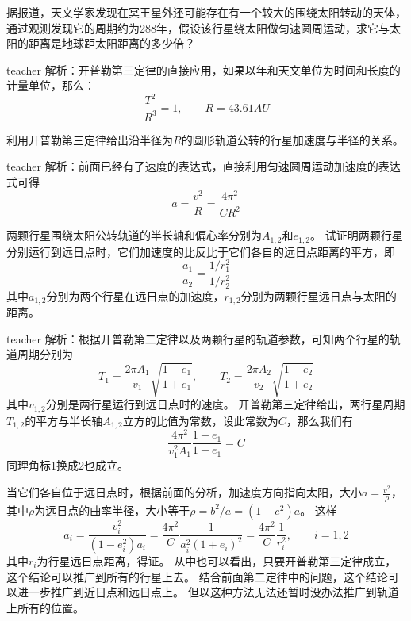 \begin{example}
据报道，天文学家发现在冥王星外还可能存在有一个较大的围绕太阳转动的天体，通过观测发现它的周期约为288年，假设该行星绕太阳做匀速圆周运动，求它与太阳的距离是地球距太阳距离的多少倍？
\begin{taggedblock}{teacher}
\newline
解析：开普勒第三定律的直接应用，如果以年和天文单位为时间和长度的计量单位，那么：
\[
\frac{T^2}{R^3} = 1,\qquad R = 43.61\unit{AU}
\]
\end{taggedblock}
\end{example}

\begin{example}
利用开普勒第三定律给出沿半径为$R$的圆形轨道公转的行星加速度与半径的关系。
\begin{taggedblock}{teacher}
\newline
解析：前面已经有了速度的表达式，直接利用匀速圆周运动加速度的表达式可得
\[
a = \frac{v^2}{R} = \frac{4\pi^2}{CR^2}
\]
\end{taggedblock}
\end{example}


\begin{example}
两颗行星围绕太阳公转轨道的半长轴和偏心率分别为$A_{1,2}$和$e_{1,2}$。
试证明两颗行星分别运行到远日点时，它们加速度的比反比于它们各自的远日点距离的平方，即
\[  \frac{a_1}{a_2} = \frac{1/r_1^2}{1/r_2^2} \]
其中$a_{1,2}$分别为两个行星在远日点的加速度，$r_{1,2}$分别为两颗行星远日点与太阳的距离。
\begin{taggedblock}{teacher}
\newline
解析：根据开普勒第二定律以及两颗行星的轨道参数，可知两个行星的轨道周期分别为
\[ T_1 = \frac{2\pi A_1}{v_1}\sqrt{\frac{1-e_1}{1+e_1}},\qquad T_2 = \frac{2\pi A_2}{v_2}\sqrt{\frac{1-e_2}{1+e_2}}\]
其中$v_{1,2}$分别是两行星运行到远日点时的速度。
开普勒第三定律给出，两行星周期$T_{1,2}$的平方与半长轴$A_{1,2}$立方的比值为常数，设此常数为$C$，那么我们有
\[
\frac{4\pi^2}{v_1^2 A_1}\frac{1-e_1}{1+e_1} = C
\]
同理角标1换成2也成立。

当它们各自位于远日点时，根据前面的分析，加速度方向指向太阳，大小$a = \frac{v^2}{\rho}$，其中$\rho$为远日点的曲率半径，大小等于$\rho = b^2/a = (1-e^2)a$。
这样
\[
a_i = \frac{v_i^2}{(1-e_i^2)a_i}  = \frac{4\pi^2}{C}\frac{1}{a_i^2(1+e_i)^2} = \frac{4\pi^2}{C}\frac{1}{r_i^2},\qquad i=1,2\]
其中$r_i$为行星远日点距离，得证。
从中也可以看出，只要开普勒第三定律成立，这个结论可以推广到所有的行星上去。
结合前面第二定律中的问题，这个结论可以进一步推广到近日点和远日点上。
但以这种方法无法还暂时没办法推广到轨道上所有的位置。
\end{taggedblock}
\end{example}

